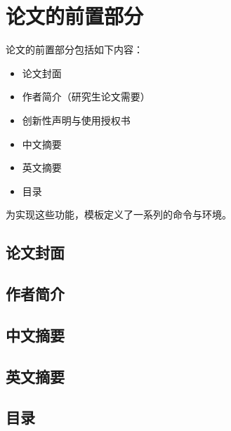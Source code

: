 

\chapter{论文的前置部分}
\label{cha:frontmatter}

论文的前置部分包括如下内容：
\begin{itemize}
\item 论文封面
\item 作者简介（研究生论文需要）
\item 创新性声明与使用授权书
\item 中文摘要
\item 英文摘要
\item 目录
\end{itemize}

为实现这些功能，模板定义了一系列的命令与环境。


\section{论文封面}
\label{sec:cover}

\section{作者简介}
\label{sec:author}

\section{中文摘要}
\label{sec:abstract-chs}


\section{英文摘要}
\label{sec:abstract-eng}

\section{目录}
\label{sec:toc}

\texttt{\tableofcontents}


